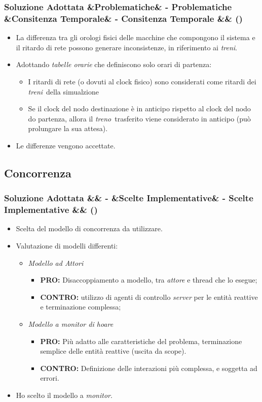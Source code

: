 \documentclass[slidestop,compress,blackandwhite]{beamer}
\newcommand{\itemB}[3]{
	\item \textbf{#1} #2 \vspace{#3}
}
\newcommand{\ii}[1]{\textit{#1}}
\newcommand{\treno}{\ii{treno}}
\newcommand{\treni}{\ii{treni}}
\newcommand{\gateway}{\ii{stazione di gateway}}
\newcommand{\newtitle}[4]{
	#1 
	\ifx&#2&%
	\else
  		\large- #2
	\fi
	\ifx&#3&%
	\else
  		\normalsize- #3
	\fi
	\ifx&#4&%
	\else
  		\normalsize (#4)
	\fi
}
\newcommand{\newframe}[5]{
	\begin{frame}
		\frametitle{\newtitle{#1}{#2}{#3}{#4}}
		#5
	\end{frame}
}
\newcommand{\myitemize}[1]{\begin{itemize}#1\end{itemize}}
\begin{document}
	\newframe{Soluzione Adottata}{Problematiche}{Consitenza Temporale}{}{
		\myitemize{
			\item La differenza tra gli orologi fisici delle macchine che compongono il sistema e il ritardo di rete possono generare inconsistenze, in riferimento ai \treni.
			\item Adottando \ii{tabelle orarie} che definiscono solo orari di partenza:
				\myitemize{
					\item I ritardi di rete (o dovuti al clock fisico) sono considerati come ritardi dei \treni~della simualzione
					\item Se il clock del nodo destinazione è in anticipo rispetto al clock del nodo do partenza, allora il \treno~trasferito viene considerato in anticipo (può prolungare la sua attesa).
				}
			\item Le differenze vengono accettate.
		}
	}
	
	\subsection{Concorrenza}\label{sol_conc}
	
	\newframe{Soluzione Adottata}{}{Scelte Implementative}{}{
		\myitemize{
			\item Scelta del modello di concorrenza da utilizzare.
			\item Valutazione di modelli differenti:
				\myitemize{
					\item \ii{Modello ad Attori}
						\myitemize{
							\itemB{PRO:}{Disaccoppiamento a modello, tra \ii{attore} e thread che lo esegue;}{0cm}
							\itemB{CONTRO:}{
									utilizzo di agenti di controllo \ii{server} per le entità reattive e terminazione complessa;
							}{0cm}
						}
					\item \ii{Modello a monitor di hoare}
						\myitemize{
							\itemB{PRO:}{Più adatto alle caratteristiche del problema, terminazione semplice delle entità reattive (uscita da scope).}{0cm}
							\itemB{CONTRO:}{Definizione delle interazioni più complessa, e soggetta ad errori.}{0cm}
						}
				}
			\item Ho scelto il modello a \ii{monitor}.
		}
	}
	
\end{document}
